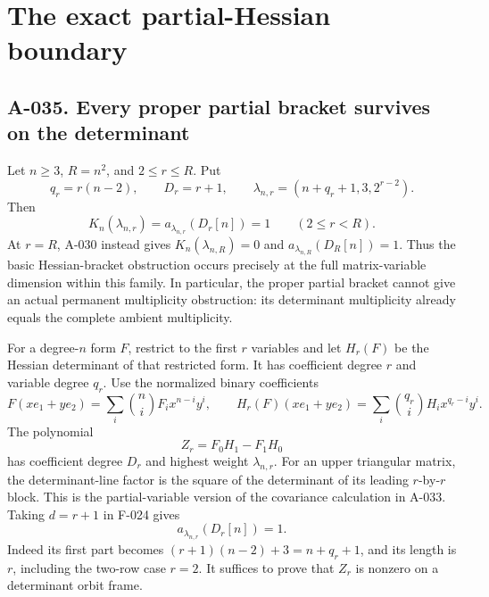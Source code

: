 \section{The exact partial-Hessian boundary}

\subsection*{A-035. Every proper partial bracket survives on the determinant}
Let \(n\geq3\), \(R=n^2\), and \(2\leq r\leq R\). Put
\[
 q_r=r(n-2),\qquad D_r=r+1,\qquad
 \lambda_{n,r}=(n+q_r+1,3,2^{r-2}).
                                                               \tag{A-035.1}
\]
Then
\[
 \boxed{\quad
 K_n(\lambda_{n,r})=a_{\lambda_{n,r}}(D_r[n])=1
                  \qquad(2\leq r<R).
 \quad}                                                        \tag{A-035.2}
\]
At \(r=R\), A-030 instead gives
\(K_n(\lambda_{n,R})=0\) and
\(a_{\lambda_{n,R}}(D_R[n])=1\).
Thus the basic Hessian-bracket obstruction occurs precisely
at the full matrix-variable dimension within this family.
In particular, the proper partial bracket cannot give an
actual permanent multiplicity obstruction: its determinant
multiplicity already equals the complete ambient multiplicity.

For a degree-\(n\) form \(F\), restrict to the first \(r\)
variables and let \(H_r(F)\) be the Hessian determinant
of that restricted form. It has coefficient degree \(r\)
and variable degree \(q_r\). Use the normalized binary
coefficients
\[
 F(xe_1+ye_2)=\sum_i\binom ni F_i x^{n-i}y^i,\qquad
 H_r(F)(xe_1+ye_2)=\sum_i\binom{q_r}i H_i x^{q_r-i}y^i.
\]
The polynomial
\[
                         Z_r=F_0H_1-F_1H_0                 \tag{A-035.3}
\]
has coefficient degree \(D_r\) and highest weight
\(\lambda_{n,r}\). For an upper triangular matrix,
the determinant-line factor is the square of the
determinant of its leading \(r\)-by-\(r\) block.
This is the partial-variable version of the covariance
calculation in A-033.
Taking \(d=r+1\) in F-024 gives
\[
 a_{\lambda_{n,r}}(D_r[n])=1.
                                                               \tag{A-035.4}
\]
Indeed its first part becomes
\((r+1)(n-2)+3=n+q_r+1\), and its length is \(r\),
including the two-row case \(r=2\).
It suffices to prove that \(Z_r\) is nonzero on a
determinant orbit frame.

